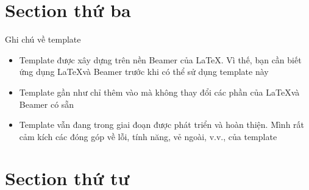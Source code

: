\documentclass{bksec}
\begin{document}
\section{Section thứ ba}
    \begin{frame}{Ghi chú về template}
        \begin{itemize}
            \item Template được xây dựng trên nền Beamer của \LaTeX. Vì thế, bạn
            cần biết ứng dụng \LaTeX và Beamer trước khi có thể sử dụng template
            này
            \item Template gần như chỉ thêm vào mà không thay đổi các phần của
            \LaTeX và Beamer có sẵn
            \item Template vẫn đang trong giai đoạn được phát triển và hoàn
            thiện. Mình rất cảm kích các đóng góp về lỗi, tính năng, vẻ ngoài,
            v.v., của template
        \end{itemize}
    \end{frame}

\section{Section thứ tư}
    \begin{frame}
        \insertthankyou
    \end{frame}
\end{document}
